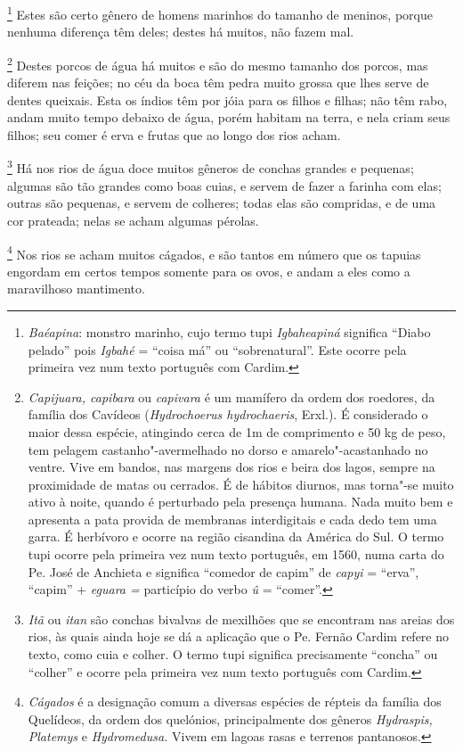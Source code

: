 \footnote{ \textit{Baéapina}: monstro marinho, cujo
termo tupi \textit{Igbaheapiná} significa ``Diabo pelado'' pois
\textit{Igbahé} = ``coisa má'' ou ``sobrenatural''. Este ocorre pela
primeira vez num texto português com Cardim.} Estes são
certo gênero de homens marinhos do tamanho de meninos, porque nenhuma
diferença têm deles; destes há muitos, não fazem mal.

\footnote{ \textit{Capijuara, capibara} ou
\textit{capivara} é um mamífero da ordem dos roedores, da família
dos Cavídeos (\textit{Hydrochoerus hydrochaeris}, Erxl.). É
considerado o maior dessa espécie, atingindo cerca de 1m de comprimento
e 50 kg de peso, tem pelagem castanho"-avermelhado no dorso e
amarelo"-acastanhado no ventre. Vive em bandos, nas margens dos rios e
beira dos lagos, sempre na proximidade de matas ou cerrados. É de
hábitos diurnos, mas torna"-se muito ativo à noite, quando é perturbado
pela presença humana. Nada muito bem e apresenta a pata provida de
membranas interdigitais e cada dedo tem uma garra. É herbívoro e ocorre
na região cisandina da América do Sul. O termo tupi ocorre pela
primeira vez num texto português, em 1560, numa carta do Pe.
José de Anchieta e significa ``comedor de capim'' de \textit{capyi} = 
``erva'', ``capim'' + \textit{eguara =} particípio do verbo \textit{û} = 
``comer''.} Destes porcos de água há muitos e são do mesmo
tamanho dos porcos, mas diferem nas feições; no céu da boca têm pedra
muito grossa que lhes serve de dentes queixais. Esta os índios têm por
jóia para os filhos e filhas; não têm rabo, andam muito tempo debaixo
de água, porém habitam na terra, e nela criam seus filhos; seu comer é
erva e frutas que ao longo dos rios acham.

\footnote{ \textit{Itã} ou \textit{itan} são conchas
bivalvas de mexilhões que se encontram nas areias dos rios, às quais
ainda hoje se dá a aplicação que o Pe. Fernão Cardim refere no texto,
como cuia e colher. O termo tupi significa precisamente ``concha'' ou
``colher'' e ocorre pela primeira vez num texto português com
Cardim.} Há nos rios de água doce muitos gêneros de conchas
grandes e pequenas; algumas são tão grandes como boas cuias, e servem
de fazer a farinha com elas; outras são pequenas, e servem de colheres;
todas elas são compridas, e de uma cor prateada; nelas se acham algumas pérolas.

\footnote{ \textit{Cágados} é a designação comum a
diversas espécies de répteis da família dos Quelídeos, da ordem dos
quelónios, principalmente dos gêneros \textit{Hydraspis, Platemys} e 
\textit{Hydromedusa.} Vivem em lagoas rasas e terrenos pantanosos.}
 Nos rios se acham muitos cágados, e são tantos em número
que os tapuias engordam em certos tempos somente para os ovos, e andam
a eles como a maravilhoso mantimento.

